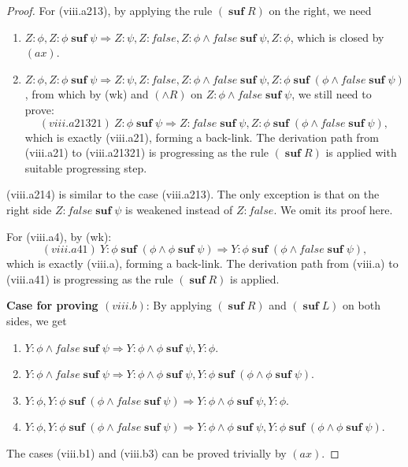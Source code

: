 \documentclass[manuscript,screen]{acmart}
\newcommand{\false}[0]{\mathit{false}}
\DeclareMathOperator{\osuf}{\mathbf{suf}}
\begin{document}
\begin{proof}
For (viii.a213), by applying the rule $(\osuf R)$ on the right, we need
\begin{enumerate}
\item[viii.a2131] $Z : \phi, Z : \phi\osuf \psi\Rightarrow Z : \psi, Z : \false, Z : \phi\wedge\false\osuf \psi, Z : \phi$, which is closed by $(ax)$. 
\item[viii.a2132] $Z : \phi, Z : \phi\osuf \psi\Rightarrow Z : \psi, Z : \false, Z : \phi\wedge\false\osuf \psi, Z : \phi\osuf (\phi\wedge\false\osuf\psi)$, from which by (wk) and $(\wedge R)$ on $Z : \phi\wedge \false\osuf\psi$, we still need to prove:
$$
(viii.a21321)\  Z : \phi\osuf \psi\Rightarrow Z : \false\osuf \psi, Z : \phi\osuf (\phi\wedge\false\osuf\psi),
$$
which is exactly (viii.a21), forming a back-link. The derivation path from (viii.a21) to (viii.a21321) is progressing as the rule $(\osuf R)$ is applied with suitable progressing step. 
\end{enumerate}

(viii.a214) is similar to the case (viii.a213). The only exception is that on the right side $Z : \false\osuf\psi$ is weakened instead of $Z : \false$. We omit its proof here. 

For (viii.a4), by (wk):
$$
(viii.a41)\ Y : \phi\osuf(\phi\wedge \phi\osuf \psi)\Rightarrow Y : \phi\osuf(\phi\wedge \false\osuf\psi), 
$$
which is exactly (viii.a), forming a back-link. 
The derivation path from (viii.a) to (viii.a41) is progressing as the rule $(\osuf R)$ is applied.  

\textbf{Case for proving $(viii.b)$}:
By applying $(\osuf R)$ and $(\osuf L)$ on both sides, we get
\begin{enumerate}
\item[(viii.b1)] $Y : \phi\wedge \false\osuf\psi\Rightarrow Y : \phi\wedge \phi\osuf\psi, Y : \phi$. 
\item[(viii.b2)]  $Y : \phi\wedge \false\osuf\psi\Rightarrow Y : \phi\wedge \phi\osuf\psi, Y : \phi\osuf(\phi\wedge \phi\osuf\psi)$. 
\item[(viii.b3)] $Y : \phi, Y : \phi\osuf(\phi\wedge\false\osuf\psi)\Rightarrow Y : \phi\wedge \phi\osuf\psi, Y : \phi$. 
\item[(viii.b4)] $Y : \phi, Y : \phi\osuf(\phi\wedge\false\osuf\psi)\Rightarrow Y : \phi\wedge \phi\osuf\psi, Y : \phi\osuf (\phi\wedge\phi\osuf\psi)$. 
\end{enumerate} 

The cases (viii.b1) and (viii.b3) can be proved trivially by $(ax)$. 


\end{proof}
\end{document}
